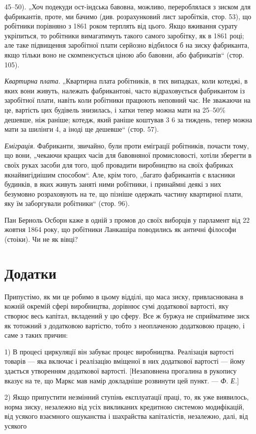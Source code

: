 \parcont{}  %
45--50). „Хоч подекуди ост-індська бавовна, можливо, перероблялася
з зиском для фабрикантів, проте, ми бачимо (див. розрахунковий
лист заробітків, стор. 53), що робітники порівняно
з 1861 роком терплять від цього. Якщо вживання сурату укріпиться,
то робітники вимагатимуть такого самого заробітку, як
в 1861 році; але таке підвищення заробітної плати серйозно
відбилося б на зиску фабриканта, якщо тільки воно не скомпенсується
ціною або бавовни, або фабрикатів“ (стор. 105).

\emph{Квартирна плата}. „Квартирна плата робітників, в тих випадках,
коли котеджі, в яких вони живуть, належать фабрикантові,
часто відраховується фабрикантом із заробітної плати,
навіть коли робітники працюють неповний час. Не зважаючи
на це, вартість цих будівель знизилась, і хатки тепер можна
мати на 25--50\% дешевше, ніж раніше; котедж, який раніше
коштував 3 6 за тиждень, тепер можна мати за шилінги 4, а іноді ще дешевше“ (стор. 57).

\emph{Еміграція}. Фабриканти, звичайно, були проти еміграції робітників,
почасти тому, що вони, „чекаючи кращих часів для бавовняної
промисловості, хотіли зберегти в своїх руках засоби
для того, щоб провадити виробництво на своїх фабриках якнайвигідиішим
способом“. Але, крім того, „багато фабрикантів
є власники будинків, в яких живуть заняті ними робітники,
і принаймні деякі з них безумовно розраховують на те, що
пізніше одержать частину квартирної плати, яку їм заборгували
робітники“ (стор. 96).

Пан Берноль Осборн каже в одній з промов до своїх виборців
у парламент від 22 жовтня 1864 року, що робітники
Ланкашіра поводились як античні філософи (стоіки). Чи не як вівці?

\section{Додатки}

Припустімо, як ми це робимо в цьому відділі, що маса
зиску, привласнювана в кожній окремій сфері виробництва, дорівнює
сумі додаткової вартості, яку створює весь капітал, вкладений
у цю сферу. Все ж буржуа не сприйматиме зиск як тотожний
з додатковою вартістю, тобто з неоплаченою додатковою
працею, і саме з таких причин:

1) В процесі циркуляції він забуває процес виробництва.
Реалізація вартості товарів — яка включає і реалізацію вміщеної
в них додаткової вартості — йому здається утворенням додаткової
вартості. [Незаповнена прогалина в рукопису вказує на те,
що Маркс мав намір докладніше розвинути цей пункт. — \emph{Ф. Е.}]

2) Якщо припустити незмінний ступінь експлуатації праці, то,
як уже виявилось, норма зиску, незалежно від усіх викликаних
кредитною системою модифікацій, від усякого взаємного ошуканства
і шахрайства капіталістів, незалежно, далі, від усякого
\parbreak{}  %
